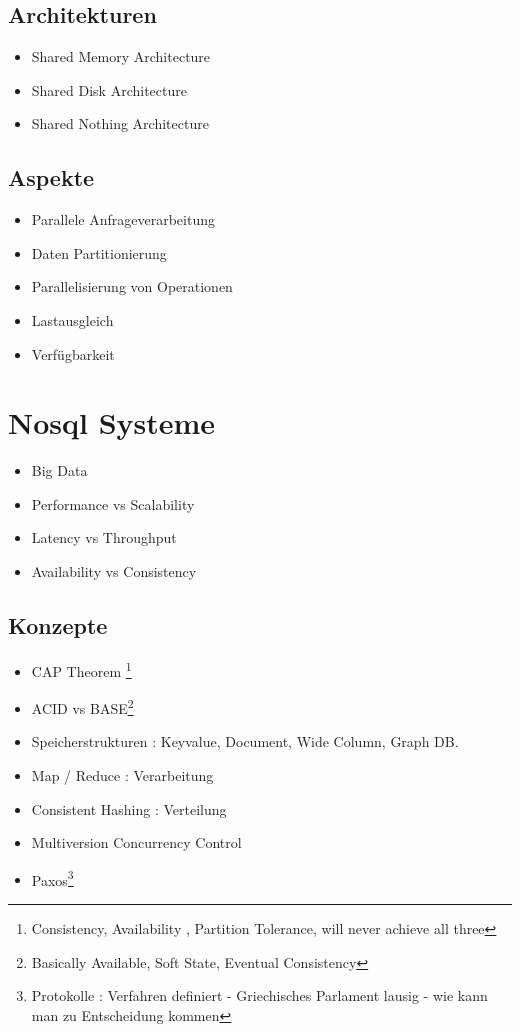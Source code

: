\documentclass[a4paper,10pt,titlepage=false]{scrreprt}
\begin{document}
\subsection{Architekturen}
\begin{itemize}
 \item Shared Memory Architecture
\item Shared Disk Architecture
\item Shared Nothing Architecture
\end{itemize}
\subsection{Aspekte}
\begin{itemize}
 \item Parallele Anfrageverarbeitung
\item Daten Partitionierung
\item Parallelisierung von Operationen
\item Lastausgleich
\item Verfügbarkeit
\end{itemize}
\section{Nosql Systeme}
 \begin{itemize}
  \item Big Data
\item Performance vs Scalability
\item Latency vs Throughput
\item Availability vs Consistency
 \end{itemize}
\subsection{Konzepte}
\begin{itemize}
 \item CAP Theorem \footnote{Consistency, Availability , Partition Tolerance, will never achieve all three}
\item ACID vs BASE\footnote{Basically Available, Soft State, Eventual Consistency}
\item Speicherstrukturen : Keyvalue, Document, Wide Column, Graph DB.
\item Map / Reduce : Verarbeitung
\item Consistent Hashing : Verteilung
\item Multiversion Concurrency Control
\item Paxos\footnote{Protokolle : Verfahren definiert - Griechisches Parlament lausig - wie kann man zu Entscheidung 
kommen}
\end{itemize}
\end{document}
